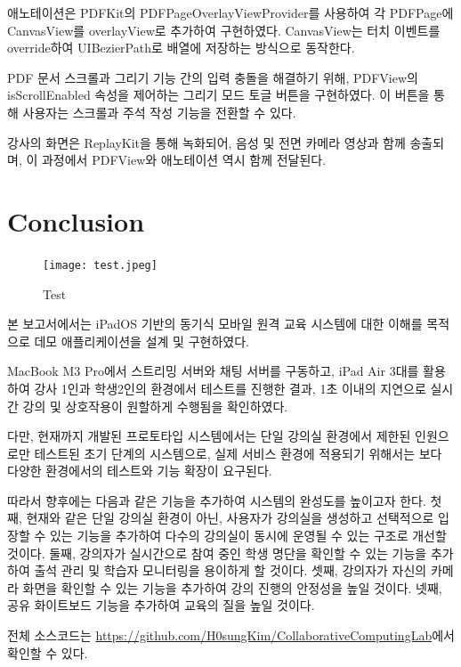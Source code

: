 \documentclass[pdflatex,sn-mathphys-num]{sn-jnl}%
\theoremstyle{thmstyleone}%
\theoremstyle{thmstyletwo}%
\theoremstyle{thmstylethree}%
\begin{document}
애노테이션은 PDFKit의 PDFPageOverlayViewProvider를 사용하여 각 PDFPage에 CanvasView를 overlayView로 추가하여 구현하였다. CanvasView는 터치 이벤트를 override하여 UIBezierPath로 배열에 저장하는 방식으로 동작한다.

PDF 문서 스크롤과 그리기 기능 간의 입력 충돌을 해결하기 위해, PDFView의 isScrollEnabled 속성을 제어하는 그리기 모드 토글 버튼을 구현하였다. 이 버튼을 통해 사용자는 스크롤과 주석 작성 기능을 전환할 수 있다.

강사의 화면은 ReplayKit\cite{ReplayKit}을 통해 녹화되어, 음성 및 전면 카메라 영상과 함께 송출되며, 이 과정에서 PDFView와 애노테이션 역시 함께 전달된다.

\section{Conclusion}\label{sec4}

\begin{figure}[h]
\centering
\texttt{[image: test.jpeg]}
\caption{Test}\label{fig3}
\end{figure}

본 보고서에서는 iPadOS 기반의 동기식 모바일 원격 교육 시스템에 대한 이해를 목적으로 데모 애플리케이션을 설계 및 구현하였다.

MacBook M3 Pro에서 스트리밍 서버와 채팅 서버를 구동하고, iPad Air 3대를 활용하여 강사 1인과 학생2인의 환경에서 테스트를 진행한 결과, 1초 이내의 지연으로 실시간 강의 및 상호작용이 원할하게 수행됨을 확인하였다.

다만, 현재까지 개발된 프로토타입 시스템에서는 단일 강의실 환경에서 제한된 인원으로만 테스트된 초기 단계의 시스템으로, 실제 서비스 환경에 적용되기 위해서는 보다 다양한 환경에서의 테스트와 기능 확장이 요구된다.

따라서 향후에는 다음과 같은 기능을 추가하여 시스템의 완성도를 높이고자 한다.
첫째, 현재와 같은 단일 강의실 환경이 아닌, 사용자가 강의실을 생성하고 선택적으로 입장할 수 있는 기능을 추가하여 다수의 강의실이 동시에 운영될 수 있는 구조로 개선할 것이다.
둘째, 강의자가 실시간으로 참여 중인 학생 명단을 확인할 수 있는 기능을 추가하여 출석 관리 및 학습자 모니터링을 용이하게 할 것이다.
셋째, 강의자가 자신의 카메라 화면을 확인할 수 있는 기능을 추가하여 강의 진행의 안정성을 높일 것이다.
넷째, 공유 화이트보드 기능을 추가하여 교육의 질을 높일 것이다.

전체 소스코드는 \href{https://github.com/H0sungKim/CollaborativeComputingLab}{https://github.com/H0sungKim/CollaborativeComputingLab}에서 확인할 수 있다.



\end{document}
